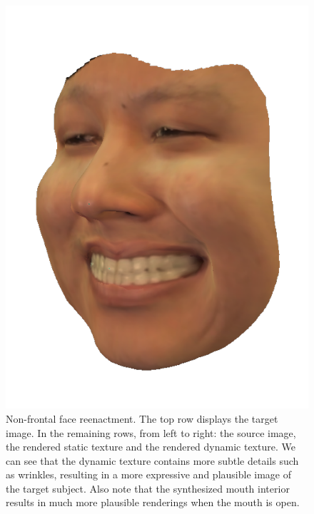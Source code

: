 \documentclass[10pt,twocolumn,letterpaper]{article}
\begin{document}
\begin{figure}[th]
\begin{center}
  \includegraphics[width=0.32\columnwidth]{figures/kylehao_transfer/dynamic_000066.png}
\end{center}
   \caption{Non-frontal face reenactment. The top row displays the target image. In the remaining rows, from left to right: the source image, the rendered static texture and the rendered dynamic texture. We can see that the dynamic texture contains more subtle details such as wrinkles, resulting in a more expressive and plausible image of the target subject. Also note that the synthesized mouth interior results in much more plausible renderings when the mouth is open.}
   \vspace{-0.05in}
\label{replaceres}
\end{figure}
\end{document}
